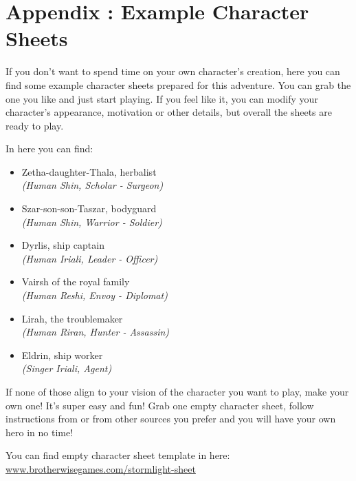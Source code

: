 \chapter{Appendix \thechapter{}: Example Character Sheets}
\label{chap:exampleSheets}

If you don't want to spend time on your own character's creation, here you can find some example character sheets prepared for this adventure. You can grab the one you like and just start playing. If you feel like it, you can modify your character's appearance, motivation or other details, but overall the sheets are ready to play.

In here you can find:
\begin{itemize}
	\item Zetha-daughter-Thala, herbalist \\ \textit{(Human Shin, Scholar - Surgeon)}
	\item Szar-son-son-Taszar, bodyguard \\ \textit{(Human Shin, Warrior - Soldier)}
	\item Dyrlis, ship captain \\ \textit{(Human Iriali, Leader - Officer)}
	\item Vairsh of the royal family \\ \textit{(Human Reshi, Envoy - Diplomat)}
	\item Lirah, the troublemaker \\ \textit{(Human Riran, Hunter - Assassin)}
	\item Eldrin, ship worker \\ \textit{(Singer Iriali, Agent)}
\end{itemize}
\newpage 

If none of those align to your vision of the character you want to play, make your own one! It's super easy and fun! Grab one empty character sheet, follow instructions from \handbook{} or from other sources you prefer and you will have your own hero in no time!

You can find empty character sheet template in here: \\

\href{https://www.brotherwisegames.com/stormlight-sheet}{www.brotherwisegames.com/stormlight-sheet}
\newpage








